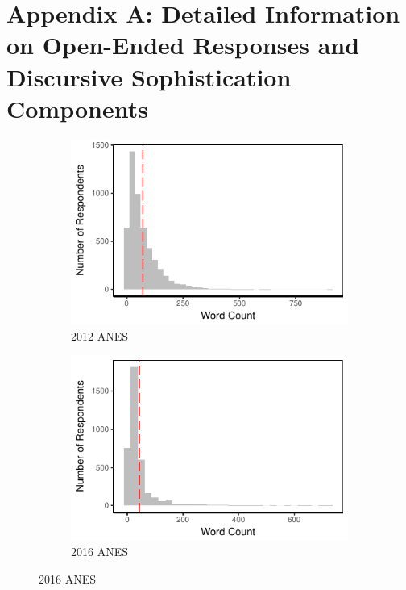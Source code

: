 \section*{Appendix A: Detailed Information on Open-Ended Responses and Discursive Sophistication Components}
\renewcommand\thefigure{A.\arabic{figure}}
\renewcommand\thetable{A.\arabic{table}}
\setcounter{figure}{0}
\setcounter{table}{0}

\begin{figure}[h]
    \centering
    \begin{subfigure}[t]{0.49\textwidth}
        \centering
        \includegraphics{../fig/anes2012_wc.pdf}
        \caption{2012 ANES}
    \end{subfigure}%
	\begin{subfigure}[t]{0.49\textwidth}
        \centering
        \includegraphics{../fig/anes2016_wc.pdf}
        \caption{2016 ANES}
    \end{subfigure}%
    

\end{figure}

